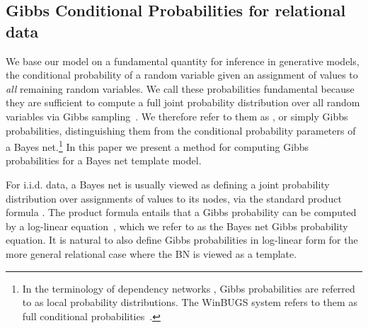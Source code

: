 \documentclass[twoside,11pt]{article}
\newcommand{\iid}{i.i.d.}
\begin{document}
%
\subsection{Gibbs Conditional Probabilities for relational data}  We base our model on a fundamental quantity for inference in generative models, the conditional probability of a random variable given an assignment of values to {\em all} remaining random variables. We call these probabilities fundamental because they are sufficient to compute a full joint probability distribution over all random variables via Gibbs sampling~\cite{Heckerman2000,Natarajan2012,Lowd2012}.
We therefore refer to them as , or simply Gibbs probabilities, distinguishing them from the conditional probability parameters of a Bayes net.\footnote{In the terminology of dependency networks \cite{Heckerman2000},  Gibbs  probabilities are referred to as local probability distributions. The WinBUGS system refers to them as full conditional probabilities~\cite{Lunn2000}.} In this paper we present a method for computing Gibbs probabilities for a Bayes net template model. 


For \iid{} data, a Bayes net is usually viewed as defining a joint probability distribution over assignments of values to its nodes, via the standard product formula \cite{Pearl1988}. The product formula entails that a Gibbs probability can be computed by a log-linear equation~\cite[Ch.14.5.2]{Russell2010}, which we refer to as the Bayes net Gibbs probability equation.
It is natural to also define Gibbs probabilities in log-linear form for the more general relational case where the BN is viewed as a template. 
\end{document}

